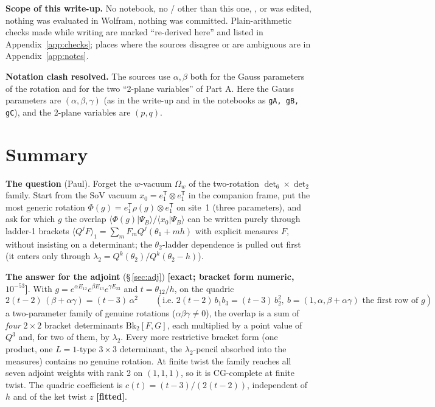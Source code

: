 \documentclass[10pt]{article}
\newcommand{\nb}[1]{\texttt{\path{#1}}}
\newcommand{\Bk}{\mathrm{Bk}_2}
\begin{document}
\textbf{Scope of this write-up.} No notebook, no \nb{.md}/\nb{.tex} other than this one, \nb{HANDOFF.md}, \nb{CLAUDE.md} or \nb{paper/*.tex} was edited, nothing was evaluated in Wolfram, nothing was committed. Plain-arithmetic checks made while writing are marked ``re-derived here'' and listed in Appendix~\ref{app:checks}; places where the sources disagree or are ambiguous are in Appendix~\ref{app:notes}.

\textbf{Notation clash resolved.} The sources use $\alpha,\beta$ both for the Gauss parameters of the rotation and for the two ``2-plane variables'' of Part A. Here the Gauss parameters are $(\alpha,\beta,\gamma)$ (as in the write-up and in the notebooks as \texttt{gA, gB, gC}), and the 2-plane variables are $(p,q)$.

\section{Summary}\label{sec:summary}

\textbf{The question} (Paul). Forget the $w$-vacuum $\Omega_w$ of the two-rotation $\det_6\times\det_2$ family. Start from the SoV vacuum $x_0=e_1^{\mathsf T}\otimes e_1^{\mathsf T}$ in the companion frame, put the most generic rotation $\Phi(g)=e_1^{\mathsf T}\rho(g)\otimes e_1^{\mathsf T}$ on site~1 (three parameters), and ask for which $g$ the overlap $\langle\Phi(g)|\Psi_B\rangle/\langle x_0|\Psi_B\rangle$ can be written purely through ladder-1 brackets $\langle Q^jF\rangle_1=\sum_mF_mQ^j(\theta_1+mh)$ with explicit measures $F$, without insisting on a determinant; the $\theta_2$-ladder dependence is pulled out first (it enters only through $\lambda_2=Q^k(\theta_2)/Q^k(\theta_2-h)$).

\textbf{The answer for the adjoint} (\S\,\ref{sec:adj}) \textbf{[exact; bracket form numeric, $10^{-53}$]}. With $g=e^{\alpha E_{12}}e^{\beta E_{13}}e^{\gamma E_{23}}$ and $t=\theta_{12}/h$, on the quadric
\[
2(t-2)\,(\beta+\alpha\gamma)=(t-3)\,\alpha^2\qquad(\text{i.e. }2(t-2)\,b_1b_3=(t-3)\,b_2^2,\ b=(1,\alpha,\beta+\alpha\gamma)\text{ the first row of }g)
\]
a two-parameter family of genuine rotations ($\alpha\beta\gamma\neq0$), the overlap is a sum of \emph{four} $2\times2$ bracket determinants $\Bk[F,G]$, each multiplied by a point value of $Q^3$ and, for two of them, by $\lambda_2$. Every more restrictive bracket form (one product, one $L=1$-type $3\times3$ determinant, the $\lambda_2$-pencil absorbed into the measures) contains no genuine rotation. At finite twist the family reaches all seven adjoint weights with rank 2 on $(1,1,1)$, so it is CG-complete at finite twist. The quadric coefficient is $c(t)=(t-3)/(2(t-2))$, independent of $h$ and of the ket twist $z$ \textbf{[fitted]}.
\end{document}
